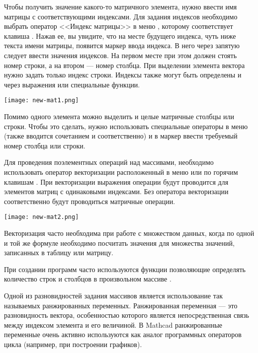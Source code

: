 Чтобы получить значение какого-то матричного элемента, нужно ввести имя матрицы с соответствующими индексами. Для задания индексов необходимо выбрать оператор <<Индекс матрицы>> в меню , которому соответствует клавиша \keys{[}. Нажав ее, вы увидите, что на месте будущего индекса, чуть ниже текста имени матрицы, появится маркер ввода индекса. В него через запятую следует ввести значения индексов. На первом месте при этом должен стоять номер строки, а на втором --- номер столбца. При выделении элемента вектора нужно задать только индекс строки. Индексы также могут быть определены и через выражения или специальные функции.
\begin{center}
	\texttt{[image: new-mat1.png]}
\end{center}


Помимо одного элемента можно выделить и целые матричные столбцы или строки. Чтобы это сделать, нужно использовать специальные операторы в меню  (также вводится сочетанием  и   соответственно)  и в маркер ввести требуемый номер столбца или строки.

Для проведения поэлементных операций над массивами, необходимо использовать оператор векторизации расположенный в меню  или по горячим клавишам \keys{\ctrl+\shift+\textasciicircum}. При векторизации выражения операции будут проводится для элементов матриц с одинаковыми индексами. Без оператора векторизации соответственно будут проводиться матричные операции.
\begin{center}
	\texttt{[image: new-mat2.png]}
\end{center}

Векторизация часто необходима при работе с множеством данных, когда по одной и той же формуле необходимо посчитать значения для множества значений, записанных в таблицу или матрицу.

При создании программ часто используются функции  позволяющие определять количество строк и столбцов в произвольном массиве .


Одной из разновидностей задания массивов является использование так называемых ранжированных переменных. Ранжированная переменная --- это разновидность вектора, особенностью которого является непосредственная связь между индексом элемента и его величиной. В Mathcad ранжированные переменные очень активно используются как аналог программных операторов цикла (например, при построении графиков).

